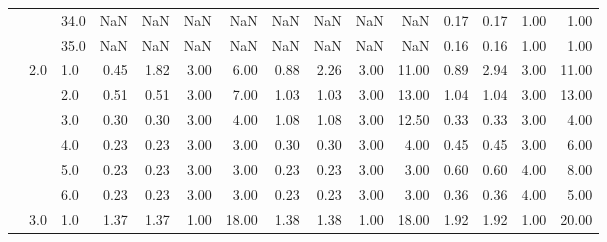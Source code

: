 \begin{tabular}{lllrrrrrrrrrrrr}
       &     & 34.0 &        NaN &       NaN &  NaN &    NaN &        NaN &       NaN &   NaN &    NaN &       0.17 &      0.17 &  1.00 &   1.00 \\
       &     & 35.0 &        NaN &       NaN &  NaN &    NaN &        NaN &       NaN &   NaN &    NaN &       0.16 &      0.16 &  1.00 &   1.00 \\
       & 2.0 & 1.0  &       0.45 &      1.82 & 3.00 &   6.00 &       0.88 &      2.26 &  3.00 &  11.00 &       0.89 &      2.94 &  3.00 &  11.00 \\
       &     & 2.0  &       0.51 &      0.51 & 3.00 &   7.00 &       1.03 &      1.03 &  3.00 &  13.00 &       1.04 &      1.04 &  3.00 &  13.00 \\
       &     & 3.0  &       0.30 &      0.30 & 3.00 &   4.00 &       1.08 &      1.08 &  3.00 &  12.50 &       0.33 &      0.33 &  3.00 &   4.00 \\
       &     & 4.0  &       0.23 &      0.23 & 3.00 &   3.00 &       0.30 &      0.30 &  3.00 &   4.00 &       0.45 &      0.45 &  3.00 &   6.00 \\
       &     & 5.0  &       0.23 &      0.23 & 3.00 &   3.00 &       0.23 &      0.23 &  3.00 &   3.00 &       0.60 &      0.60 &  4.00 &   8.00 \\
       &     & 6.0  &       0.23 &      0.23 & 3.00 &   3.00 &       0.23 &      0.23 &  3.00 &   3.00 &       0.36 &      0.36 &  4.00 &   5.00 \\
       & 3.0 & 1.0  &       1.37 &      1.37 & 1.00 &  18.00 &       1.38 &      1.38 &  1.00 &  18.00 &       1.92 &      1.92 &  1.00 &  20.00 \\
\bottomrule
\end{tabular}
